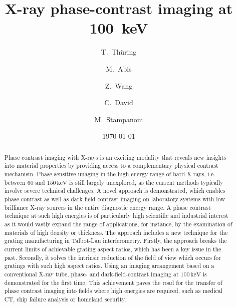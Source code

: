 \documentclass[aip,apl,amsmath,amssymb,floatfix,reprint,a4paper]{revtex4-1}
\newcommand{\unit}[1]{\ensuremath{\, \mathrm{#1}}}
\begin{document}
\title{X-ray phase-contrast imaging at 100~keV}

\author{T.~Thüring}
\author{M.~Abis}
\author{Z.~Wang}
\author{C.~David}
\author{M.~Stampanoni}

\date{\today}


\begin{abstract}
Phase contrast imaging with X-rays is an exciting modality that reveals new insights into material properties by providing access to a complementary physical contrast mechanism. Phase sensitive imaging in the high energy range of hard X-rays, i.e. between 60 and $150 \unit{keV}$ is still largely unexplored, as the current methods typically involve severe technical challenges. A novel approach is demonstrated, which enables phase contrast as well as dark field contrast imaging on laboratory systems with low brilliance X-ray sources in the entire diagnostic energy range. A phase contrast technique at such high energies is of particularly high scientific and industrial interest as it would vastly expand the range of applications, for instance, by the examination of materials of high density or thickness. The approach includes a new technique for the grating manufacturing in Talbot-Lau interferometry. Firstly, the approach breaks the current limits of achievable grating aspect ratios, which has been a key issue 
in the past. Secondly, it solves the intrinsic reduction of the field of view which occurs for gratings with such high aspect ratios. Using an imaging arrangement based on a conventional X-ray tube, phase- and dark-field-contrast imaging at $100 \unit{keV}$ is demonstrated for the first time. This achievement paves the road for the transfer of phase contrast imaging into fields where high energies are required, such as medical CT, chip failure analysis or homeland security.
\end{abstract}
\end{document}
